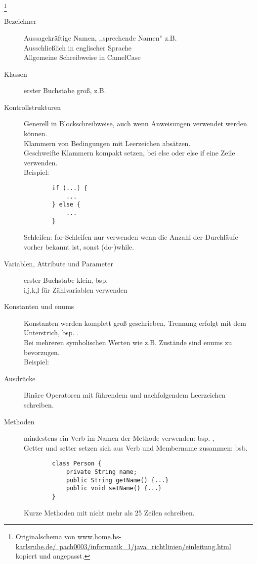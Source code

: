   	
\footnote{ Originalschema von \href{http://www.home.hs-karlsruhe.de/~pach0003/informatik\_1/java\_richtlinien/einleitung.html}
	{www.home.hs-karlsruhe.de/~pach0003/informatik\_1/java\_richtlinien/einleitung.html} kopiert und angepasst.
}
\begin{description}
\item [Bezeichner]
	Aussagekräftige Namen, ,,sprechende Namen'' z.B.  \\
	Ausschließlich in englischer Sprache \\
    Allgemeine Schreibweise in CamelCase \\
\item [Klassen]
	erster Buchstabe groß, z.B.  \\
\item [Kontrollstrukturen]
	Generell in Blockschreibweise, auch wenn Anweisungen verwendet werden können. \\
	Klammern von Bedingungen mit Leerzeichen absätzen. \\
	Geschweifte Klammern kompakt setzen, bei else oder else if eine Zeile verwenden. \\
	Beispiel:
	\begin{lstlisting}
		if (...) {
			... 
		} else {
			...
		}
	\end{lstlisting}
	Schleifen: for-Schleifen nur verwenden wenn die Anzahl der Durchläufe vorher bekannt ist, sonst (do-)while.
\item [Variablen, Attribute und Parameter]
	erster Buchstabe klein, bsp.  \\
    i,j,k,l für Zählvariablen verwenden
	
\item [Konstanten und enums]
	Konstanten werden komplett groß geschrieben, Trennung erfolgt mit dem Unterstrich, bsp. . \\
	Bei mehreren symbolischen Werten wie z.B. Zustände sind enums zu bevorzugen. \\
	Beispiel:

\item [Ausdrücke]
	Binäre Operatoren mit führendem und nachfolgendem Leerzeichen schreiben. \\

\item [Methoden]
	mindestens ein Verb im Namen der Methode verwenden: bsp. ,  \\
	Getter und setter setzen sich aus Verb und Membername zusammen: bsb. \\
	\begin{lstlisting}
		class Person {
			private String name;
			public String getName() {...}
			public void setName() {...}
		}
	\end{lstlisting}
	Kurze Methoden mit nicht mehr als 25 Zeilen schreiben. 


\end{description}

